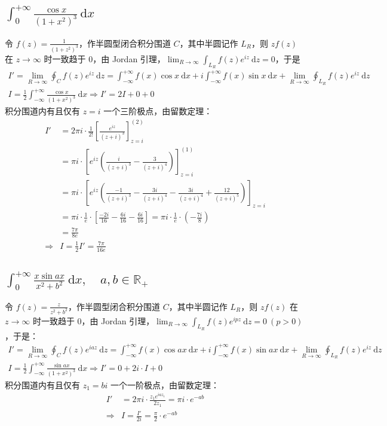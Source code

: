 \documentclass[UTF8]{report}
\def\R{\mathbb{R}}
\theoremstyle{MyLineTheoremStyle} %
\theoremstyle{MyBlockTheoremStyle} %
\theoremstyle{MySubsubsectionStyle} %
\begin{document}
\subsection{$\displaystyle \int_{0}^{+\infty}  \frac{\cos x}{\left(1 + x^2\right)^3}  \ \mathrm{d}x$}
令 $f(z) = \frac{1}{\left(1 + z^2\right)^3}$，作半圆型闭合积分围道 $C$，其中半圆记作 $L_R$，则 $zf(z)$ 在 $z \to \infty$ 时一致趋于 0，由 Jordan 引理，$\lim_{R \to \infty}\int_{L_R} f(z)e^{iz} \ \mathrm{d}z = 0$，于是
\begin{gather}
I' = \lim_{R \to \infty}\oint_{C} f(z)e^{iz} \ \mathrm{d}z = \int_{-\infty}^{+\infty}f(x)\cos x \ \mathrm{d}x + i \int_{-\infty}^{+\infty}f(x)\sin x \ \mathrm{d}x +  \lim_{R \to \infty}\oint_{L_R} f(z)e^{iz} \ \mathrm{d}z \\ 
I = \frac{1}{2}\int_{-\infty}^{+\infty}  \frac{\cos x}{\left(1 + x^2\right)^3}  \ \mathrm{d}x \Longrightarrow I' = 2I + 0 + 0 
\end{gather}
积分围道内有且仅有 $z = i$ 一个三阶极点，由留数定理：
\begin{align}
I' &= 2\pi i \cdot \frac{1}{2!} \left[ \frac{e^{iz}}{(z + i)^3} \right]^{(2)}_{z = i} \\
&= \pi i \cdot \left[ e^{iz} \left( \frac{i}{(z + i)^3} - \frac{3}{(z + i)^4}\right) \right]^{(1)}_{z = i} \\
&= \pi i \cdot \left[ e^{iz} \left( \frac{-1}{(z + i)^3} - \frac{3i}{(z + i)^4} - \frac{3i}{(z + i)^4} + \frac{12}{(z + i)^5}\right) \right]_{z = i} \\
&= \pi i \cdot \frac{1}{e} \cdot \left[ \frac{-2i}{16} - \frac{6i}{16} - \frac{6i}{16} \right] = \pi i \cdot \frac{1}{e}\cdot \left(- \frac{7i}{8}\right) \\ 
& = \frac{7\pi}{8e} \\
\Longrightarrow 
&\boxed{
I = \frac{1}{2}I' = \frac{7\pi}{16e}
}
\end{align}

\subsection{$\displaystyle \int_{0}^{+\infty} \frac{x\sin ax}{x^2 + b^2} \ \mathrm{d}x,\quad a, b \in \R_+ $}
令 $f(z) = \frac{z}{z^2 + b^2}$，作半圆型闭合积分围道 $C$，其中半圆记作 $L_R$，则 $zf(z)$ 在 $z \to \infty$ 时一致趋于 0，由 Jordan 引理，$\lim_{R \to \infty}\int_{L_R} f(z)e^{ipz} \ \mathrm{d}z = 0\ (p > 0)$，于是：
\begin{gather}
I' = \lim_{R \to \infty}\oint_{C} f(z)e^{iaz} \ \mathrm{d}z = \int_{-\infty}^{+\infty}f(x)\cos ax \ \mathrm{d}x + i \int_{-\infty}^{+\infty}f(x)\sin ax \ \mathrm{d}x +  \lim_{R \to \infty}\oint_{L_R} f(z)e^{iz} \ \mathrm{d}z \\
I = \frac{1}{2}\int_{-\infty}^{+\infty}  \frac{\sin ax}{\left(1 + x^2\right)^3}  \ \mathrm{d}x \Longrightarrow I' = 0 + 2i\cdot I + 0 
\end{gather}
积分围道内有且仅有 $z_1 = bi$ 一个一阶极点，由留数定理：
\begin{align}
I' 
&= 2\pi i \cdot \frac{z_1e^{iaz_1}}{2z_1} = \pi i \cdot e^{-ab} \\
\Longrightarrow & 
\boxed{
    I = \frac{I'}{2i} = \frac{\pi}{2} \cdot e^{-ab}
}
\end{align}
\end{document}
